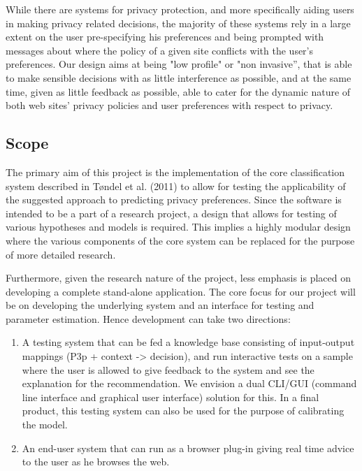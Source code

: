 While there are systems for privacy protection, and more specifically aiding users in making privacy related decisions, the majority of these systems rely in a large extent on the user pre-specifying his preferences and being prompted with messages about where the policy of a given site conflicts with the user's preferences. Our design aims at being "low profile" or "non invasive'', that is able to make sensible decisions with as little interference as possible, and at the same time, given as little feedback as possible, able to cater for the dynamic nature of both web sites' privacy policies and user preferences with respect to privacy.

\subsection{Scope}\label{reqScope}

The primary aim of this project is the implementation of the core classification system described in T{\o}ndel et al. (2011) to allow for testing the applicability of the suggested approach to predicting privacy preferences. Since the software is intended to be a part of a research project, a design that allows for testing of various hypotheses and models is required. This implies a highly modular design where the various components of the core system can be replaced for the purpose of more detailed research. 

Furthermore, given the research nature of the project, less emphasis is placed on developing a complete stand-alone application. The core focus for our project will be on developing the underlying system and an interface for testing and parameter estimation. Hence development can take two directions:

\begin{enumerate}
\item A testing system that can be fed a knowledge base consisting of input-output mappings (P3p + context -> decision), and run interactive tests on a sample where the user is allowed to give feedback to the system and see the explanation for the recommendation. We envision a dual CLI/GUI (command line interface and graphical user interface) solution for this. In a final product, this testing system can also be used for the purpose of calibrating the model.
\item An end-user system that can run as a browser plug-in giving real time advice to the user as he browses the web.
\end{enumerate}

